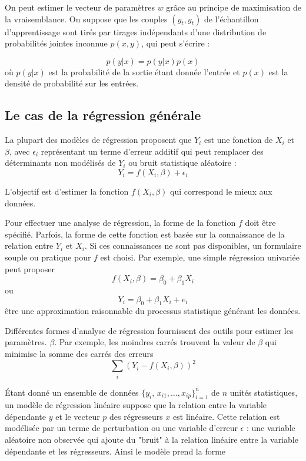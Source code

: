 		On peut estimer le vecteur de paramètres $w$ grâce au principe de maximisation de la vraisemblance. On suppose que les couples $(y_t, y_t)$ de l'échantillon d'apprentissage sont tirés par tirages indépendants d'une distribution de probabilités jointes inconnue $p(x, y)$, qui peut s'écrire :
		
		$$
			p(y|x) = p(y|x)p(x)
		$$
		où $p(y|x)$ est la probabilité de la sortie étant donnée l'entrée et $p(x)$ est la densité de probabilité sur les entrées.
		
		\cite{matloff2017statistical}
		
	\subsection{Le cas de la régression générale}
		La plupart des modèles de régression proposent que $Y_{i}$ est une fonction de $X_{i}$ et $\beta$, avec $\epsilon_{i}$ représentant un terme d'erreur additif qui peut remplacer des déterminants non modélisés de $Y_{i}$ ou bruit statistique aléatoire :
		\begin{equation}
			{\displaystyle Y_{i}=f(X_{i},\beta )+\epsilon_{i}}
		\end{equation}
	
	L'objectif est d'estimer la fonction ${\displaystyle f(X_{i},\beta )}$ qui correspond le mieux aux données.
	
	 Pour effectuer une analyse de régression, la forme de la fonction $f$ doit être spécifié. Parfois, la forme de cette fonction est basée sur la connaissance de la relation entre $Y_{i}$ et $X_{i}$. 
	 Si ces connaissances ne sont pas disponibles, un formulaire souple ou pratique pour $f$ est choisi. Par exemple, une simple régression univariée peut proposer
	 $${\displaystyle f(X_{i},\beta )=\beta _{0}+\beta _{1}X_{i}}$$
	 ou
	 $${\displaystyle Y_{i}=\beta _{0}+\beta _{1}X_{i}+e_{i}}$$
	 être une approximation raisonnable du processus statistique générant les données.
	 
	 Différentes formes d'analyse de régression fournissent des outils pour estimer les paramètres. $\beta$. Par exemple, les moindres carrés trouvent la valeur de $\beta$ qui minimise la somme des carrés des erreurs $${\sum _{i}(Y_{i}-f(X_{i},\beta ))^{2}}$$ 
	 
	 Étant donné un ensemble de données ${\displaystyle \{y_{i},\,x_{i1},\ldots ,x_{ip}\}_{i=1}^{n}}$ de $n$ unités statistiques, un modèle de régression linéaire suppose que la relation entre la variable dépendante $y$ et le vecteur $p$ des régresseurs $x$ est linéaire. Cette relation est modélisée par un terme de perturbation ou une variable d'erreur $\epsilon$ : une variable aléatoire non observée qui ajoute du "bruit" à la relation linéaire entre la variable dépendante et les régresseurs. Ainsi le modèle prend la forme
	 
